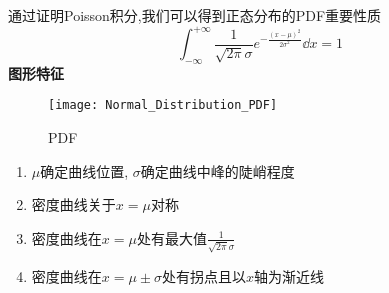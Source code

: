 通过证明Poisson积分,我们可以得到正态分布的PDF重要性质
\begin{equation}
    \int_{-\infty}^{+\infty}\frac{1}{\sqrt{2\pi}\sigma}e^{-\frac{(x-\mu)^2}{2\sigma^2}}\dd x = 1
\end{equation}
\newpage
\textbf{图形特征}
\begin{figure}[h]
    \centering
    \texttt{[image: Normal\_Distribution\_PDF]}
    \caption{PDF}
\end{figure}
\begin{enumerate}
    \item $\mu$确定曲线位置, $\sigma$确定曲线中峰的陡峭程度
    \item 密度曲线关于$x=\mu$对称
    \item 密度曲线在$x=\mu$处有最大值$\frac{1}{\sqrt{2\pi}\sigma}$
    \item 密度曲线在$x=\mu\pm\sigma$处有拐点且以$x$轴为渐近线
\end{enumerate}
